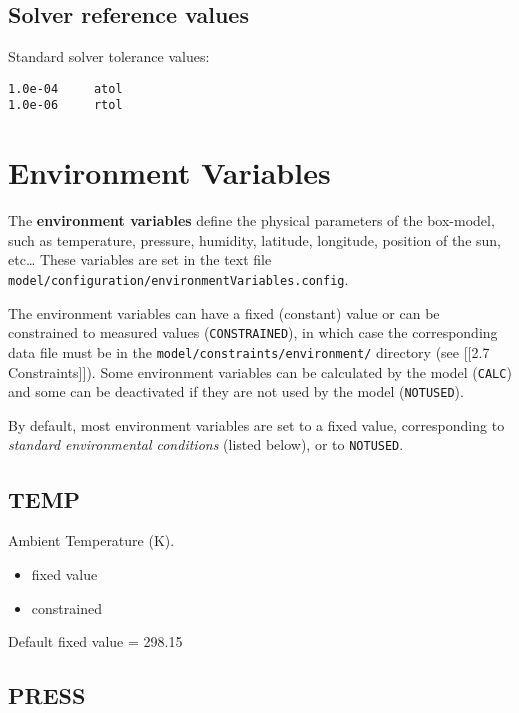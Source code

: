 \subsection{Solver reference values} \label{solver-reference-values}

Standard solver tolerance values:

\begin{verbatim}
1.0e-04     atol
1.0e-06     rtol
\end{verbatim}

\section{Environment Variables} \label{sec:environment}

The \textbf{environment variables} define the physical parameters of the
box-model, such as temperature, pressure, humidity, latitude, longitude,
position of the sun, etc\ldots{} These variables are set in the text
file \texttt{model/configuration/environmentVariables.config}.

The environment variables can have a fixed (constant) value or can be
constrained to measured values (\texttt{CONSTRAINED}), in which case the
corresponding data file must be in the
\texttt{model/constraints/environment/} directory (see {[}{[}2.7
Constraints{]}{]}). Some environment variables can be calculated by the
model (\texttt{CALC}) and some can be deactivated if they are not used
by the model (\texttt{NOTUSED}).

By default, most environment variables are set to a fixed value,
corresponding to \emph{standard environmental conditions} (listed
below), or to \texttt{NOTUSED}.

\subsection{TEMP} \label{temp}

Ambient Temperature (K).

\begin{itemize}
\item
  fixed value
\item
  constrained
\end{itemize}

Default fixed value = 298.15

\subsection{PRESS} \label{press}

